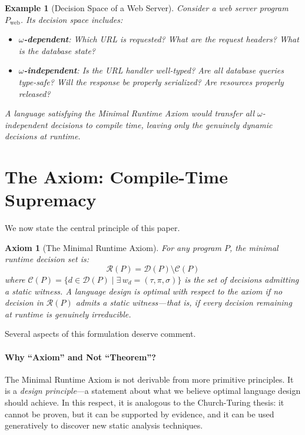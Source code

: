 \documentclass[11pt]{article}
\newtheorem{example}[theorem]{Example}
\newtheorem{axiom}{Axiom}
\newcommand{\DP}{\mathcal{D}(P)}
\newcommand{\CP}{\mathcal{C}(P)}
\newcommand{\RP}{\mathcal{R}(P)}
\newcommand{\witness}{w_d}
\begin{document}
\begin{example}[Decision Space of a Web Server]
Consider a web server program $P_{\text{web}}$. Its decision space includes:
\begin{itemize}[nosep]
  \item \textbf{$\omega$-dependent}: Which URL is requested? What are the request headers? What is the database state?
  \item \textbf{$\omega$-independent}: Is the URL handler well-typed? Are all database queries type-safe? Will the response be properly serialized? Are resources properly released?
\end{itemize}
A language satisfying the Minimal Runtime Axiom would transfer \emph{all} $\omega$-independent decisions to compile time, leaving only the genuinely dynamic decisions at runtime.
\end{example}


\section{The Axiom: Compile-Time Supremacy}
\label{sec:axiom}

We now state the central principle of this paper.

\begin{axiom}[The Minimal Runtime Axiom]
\label{axiom:mra}
For any program $P$, the \emph{minimal runtime decision set} is:
\[
  \RP = \DP \setminus \CP
\]
where $\CP = \{ d \in \DP \mid \exists\, \witness = (\tau, \pi, \sigma) \}$ is the
set of decisions admitting a static witness. A language design is \emph{optimal with
respect to the axiom} if no decision in $\RP$ admits a static witness---that is, if
every decision remaining at runtime is genuinely irreducible.
\end{axiom}

Several aspects of this formulation deserve comment.

\paragraph{Why ``Axiom'' and Not ``Theorem''?}
The Minimal Runtime Axiom is not derivable from more primitive principles. It is a
\emph{design principle}---a statement about what we believe optimal language design
should achieve. In this respect, it is analogous to the Church-Turing thesis: it
cannot be proven, but it can be supported by evidence, and it can be used generatively
to discover new static analysis techniques.
\end{document}
